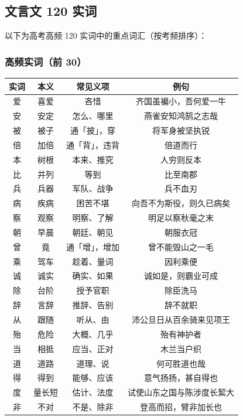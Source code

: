 \newpage

\subsection{文言文 120 实词}

以下为高考高频 120 实词中的重点词汇（按考频排序）：

\subsubsection{高频实词（前 30）}

\begin{center}
\begin{tabular}{c|c|c|c}
\textbf{实词} & \textbf{本义} & \textbf{常见义项} & \textbf{例句} \\ \hline
爱 & 喜爱 & 吝惜 & 齐国虽褊小，吾何爱一牛 \\
安 & 安定 & 怎么、哪里 & 燕雀安知鸿鹄之志哉 \\
被 & 被子 & 通「披」，穿 & 将军身被坚执锐 \\
倍 & 加倍 & 通「背」，违背 & 倍道而行 \\
本 & 树根 & 本来、推究 & 人穷则反本 \\
比 & 并列 & 等到 & 比至南郡 \\
兵 & 兵器 & 军队、战争 & 兵不血刃 \\
病 & 疾病 & 困苦不堪 & 向吾不为斯役，则久已病矣 \\
察 & 观察 & 明察、了解 & 明足以察秋毫之末 \\
朝 & 早晨 & 朝廷、朝见 & 朝服衣冠 \\
曾 & 竟 & 通「增」，增加 & 曾不能毁山之一毛 \\
乘 & 驾车 & 趁着、量词 & 因利乘便 \\
诚 & 诚实 & 确实、如果 & 诚如是，则霸业可成 \\
除 & 台阶 & 授予官职 & 除臣洗马 \\
辞 & 言辞 & 推辞、告别 & 辞不就职 \\
从 & 跟随 & 听从、由 & 沛公旦日从百余骑来见项王 \\
殆 & 危险 & 大概、几乎 & 殆有神护者 \\
当 & 相抵 & 应当、正对 & 木兰当户织 \\
道 & 道路 & 道理、说 & 何可胜道也哉 \\
得 & 得到 & 能够、应该 & 意气扬扬，甚自得也 \\
度 & 量长短 & 估计、法度 & 试使山东之国与陈涉度长絜大 \\
非 & 不对 & 不是、除非 & 登高而招，臂非加长也 \\

\end{tabular}
\end{center}
